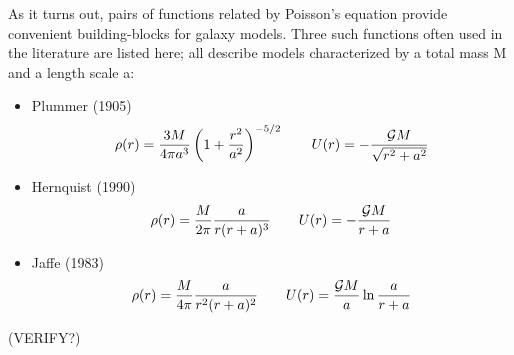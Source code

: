 \vspace{0.5cm}

As it turns out, pairs of functions related by Poisson's equation provide 
convenient building-blocks for galaxy models. 
Three such functions often used in the literature are listed here; all describe models characterized
by a total mass M and a length scale a:

\begin{itemize}
\item Plummer (1905) \cite{dejo87} 
\[
\rho(r)= \frac{3M}{4\pi a^3 }\left(1+\frac{r^2}{a^2} \right)^{-5/2}
\qquad
U(r)=-\frac{{\cal G}M}{\sqrt{r^2+a^2}}
\]
\item Hernquist (1990)
\[
\rho(r)=\frac{M}{2\pi} \frac{a}{r(r+a)^3} 
\qquad
U(r)=-\frac{{\cal G}M}{r+a}
\]
\item Jaffe (1983)
\[
\rho(r)=\frac{M}{4\pi} \frac{a}{r^2(r+a)^2} 
\qquad
U(r)=\frac{{\cal G}M}{a} \ln \frac{a}{r+a}
\]
\end{itemize}

(VERIFY?)

